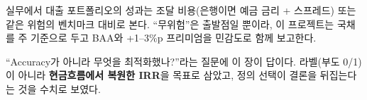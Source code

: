 \begin{insight}
실무에서 대출 포트폴리오의 성과는 조달 비용(은행이면 예금 금리 + 스프레드) 또는 같은 위험의 벤치마크 대비로 본다. ``무위험''은 출발점일 뿐이라, 이 프로젝트는 국채를 주 기준으로 두고 BAA와 +1--3\%p 프리미엄을 민감도로 함께 보고한다.
\end{insight}

\begin{career}
``Accuracy가 아니라 무엇을 최적화했나?''라는 질문에 이 장이 답이다. 라벨(부도 0/1)이 아니라 \textbf{현금흐름에서 복원한 IRR}을 목표로 삼았고, 정의 선택이 결론을 뒤집는다는 것을 수치로 보였다.
\end{career}
